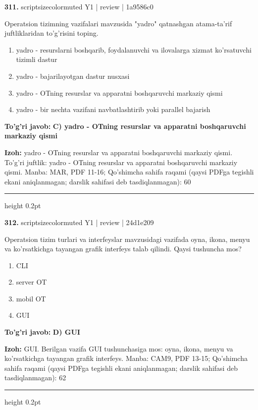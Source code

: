 \documentclass[10pt,a4paper]{article}
\begin{document}
{\bfseries\sffamily\color{ink} 311.} {scriptsizecolor{muted} Y1 | review | 1a9586c0}
\par
Operatsion tizimning vazifalari mavzusida "yadro" qatnashgan atama-ta'rif juftliklaridan to'g'risini toping.
\begin{enumerate}[label=\Alph*),leftmargin=9mm]
\item yadro - resurslarni boshqarib, foydalanuvchi va ilovalarga xizmat ko'rsatuvchi tizimli dastur
\item yadro - bajarilayotgan dastur nusxasi
\item yadro - OTning resurslar va apparatni boshqaruvchi markaziy qismi
\item yadro - bir nechta vazifani navbatlashtirib yoki parallel bajarish
\end{enumerate}
\begin{tcolorbox}[enhanced,breakable,colback=teal!4,colframe=teal!60!black,boxrule=0.45pt,arc=1.2mm,left=2.7mm,right=2.7mm,top=1.8mm,bottom=1.8mm,before skip=2mm,after skip=2mm]
{\bfseries\sffamily\color{teal}To'g'ri javob:} \textbf{C) yadro - OTning resurslar va apparatni boshqaruvchi markaziy qismi}
\par\smallskip
{\bfseries Izoh:} yadro - OTning resurslar va apparatni boshqaruvchi markaziy qismi. To'g'ri juftlik: yadro - OTning resurslar va apparatni boshqaruvchi markaziy qismi. Manba: MAR, PDF 11-16; Qo'shimcha sahifa raqami (qaysi PDFga tegishli ekani aniqlanmagan; darslik sahifasi deb tasdiqlanmagan): 60
\end{tcolorbox}
\vspace{2mm}\hrule height 0.2pt\vspace{3mm}

{\bfseries\sffamily\color{ink} 312.} {scriptsizecolor{muted} Y1 | review | 24d1e209}
\par
Operatsion tizim turlari va interfeyslar mavzusidagi vazifada oyna, ikona, menyu va ko'rsatkichga tayangan grafik interfeys talab qilindi. Qaysi tushuncha mos?
\begin{enumerate}[label=\Alph*),leftmargin=9mm]
\item CLI
\item server OT
\item mobil OT
\item GUI
\end{enumerate}
\begin{tcolorbox}[enhanced,breakable,colback=teal!4,colframe=teal!60!black,boxrule=0.45pt,arc=1.2mm,left=2.7mm,right=2.7mm,top=1.8mm,bottom=1.8mm,before skip=2mm,after skip=2mm]
{\bfseries\sffamily\color{teal}To'g'ri javob:} \textbf{D) GUI}
\par\smallskip
{\bfseries Izoh:} GUI. Berilgan vazifa GUI tushunchasiga mos: oyna, ikona, menyu va ko'rsatkichga tayangan grafik interfeys. Manba: CAM9, PDF 13-15; Qo'shimcha sahifa raqami (qaysi PDFga tegishli ekani aniqlanmagan; darslik sahifasi deb tasdiqlanmagan): 62
\end{tcolorbox}
\vspace{2mm}\hrule height 0.2pt\vspace{3mm}
\end{document}
